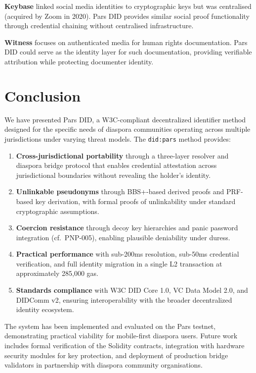 \documentclass[11pt,a4paper]{article}
\begin{document}
\textbf{Keybase} \cite{keybase} linked social media identities to cryptographic
keys but was centralised (acquired by Zoom in 2020). Pars DID provides similar
social proof functionality through credential chaining without centralised
infrastructure.

\textbf{Witness} \cite{witness-org} focuses on authenticated media for human rights
documentation. Pars DID could serve as the identity layer for such documentation,
providing verifiable attribution while protecting documenter identity.

\section{Conclusion}
\label{sec:conclusion}

We have presented Pars DID, a W3C-compliant decentralized identifier method designed
for the specific needs of diaspora communities operating across multiple jurisdictions
under varying threat models. The \texttt{did:pars} method provides:

\begin{enumerate}
    \item \textbf{Cross-jurisdictional portability} through a three-layer resolver
          and diaspora bridge protocol that enables credential attestation across
          jurisdictional boundaries without revealing the holder's identity.
    \item \textbf{Unlinkable pseudonyms} through BBS+-based derived proofs and
          PRF-based key derivation, with formal proofs of unlinkability under
          standard cryptographic assumptions.
    \item \textbf{Coercion resistance} through decoy key hierarchies and panic
          password integration (cf.\ PNP-005), enabling plausible deniability
          under duress.
    \item \textbf{Practical performance} with sub-200ms resolution, sub-50ms
          credential verification, and full identity migration in a single L2
          transaction at approximately 285{,}000 gas.
    \item \textbf{Standards compliance} with W3C DID Core 1.0, VC Data Model 2.0,
          and DIDComm v2, ensuring interoperability with the broader decentralized
          identity ecosystem.
\end{enumerate}

The system has been implemented and evaluated on the Pars testnet, demonstrating
practical viability for mobile-first diaspora users. Future work includes formal
verification of the Solidity contracts, integration with hardware security modules
for key protection, and deployment of production bridge validators in partnership
with diaspora community organisations.
\end{document}
